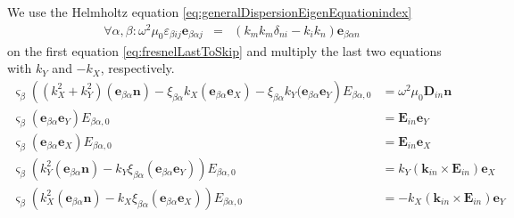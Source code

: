 \documentclass[12pt,a4paper,twoside,openright,BCOR10mm,headsepline,titlepage,abstracton,chapterprefix,final]{scrreprt}
\newcommand\Vector[1]{{\mathbf{#1}}}
\newcommand\vacuum{0}
\newcommand\wavenumber{k}
\newcommand\Wavevector{\Vector{\wavenumber}}
\newcommand\scalarEfield{E}
\newcommand\scalarDfield{D}
\newcommand\Efield{\Vector{\scalarEfield}}
\newcommand\Dfield{\Vector{\scalarDfield}}
\newcommand\vacuumpermeability{\scalarpermeability_{\vacuum}}
\newcommand\scalarpermeability{\mu}
\newcommand\scalarpermittivity{\varepsilon}
\begin{document}
We use the Helmholtz equation \eqref{eq:generalDispersionEigenEquationindex}
\begin{eqnarray}
 \forall \alpha, \beta : \omega^2 \vacuumpermeability \scalarpermittivity_{\beta ij} \Vector{e}_{\beta \alpha j} 
 &=&
 \left(
   \wavenumber_m \wavenumber_m \delta_{ni}
   -
   \wavenumber_i \wavenumber_n
 \right)
 \Vector{e}_{\beta \alpha n} 
\end{eqnarray}
on the first equation \eqref{eq:fresnelLastToSkip} and multiply the last two equations 
with $\wavenumber_Y$ and $-\wavenumber_X$, respectively.
\begin{subequations}
  \begin{align*}
    \varsigma_\beta \left( ( \wavenumber_X^2 + \wavenumber_Y^2 ) (\Vector{e}_{\beta\alpha} \Vector{n}) - \xi_{\beta\alpha} \wavenumber_X (\Vector{e}_{\beta\alpha} \Vector{e}_X) - \xi_{\beta\alpha} \wavenumber_Y (\Vector{e}_{\beta\alpha} \Vector{e}_Y  \right) E_{\beta\alpha,0} &= \omega^2 \vacuumpermeability \Dfield_{in} \Vector{n} \\
    \varsigma_\beta (\Vector{e}_{\beta\alpha} \Vector{e}_Y) E_{\beta\alpha,0} &= \Efield_{in} \Vector{e}_Y \\
    \varsigma_\beta (\Vector{e}_{\beta\alpha} \Vector{e}_X) E_{\beta\alpha,0} &= \Efield_{in} \Vector{e}_X \\
    \varsigma_\beta \left( \wavenumber_Y^2 ( \Vector{e}_{\beta\alpha} \Vector{n} )  - \wavenumber_Y \xi_{\beta\alpha} ( \Vector{e}_{\beta\alpha} \Vector{e}_Y) \right) E_{\beta\alpha,0} &=  \wavenumber_Y (\Wavevector_{in} \times \Efield_{in}) \Vector{e}_X \\
    \varsigma_\beta \left( \wavenumber_X^2 ( \Vector{e}_{\beta\alpha} \Vector{n} )  - \wavenumber_X \xi_{\beta\alpha} ( \Vector{e}_{\beta\alpha} \Vector{e}_X) \right) E_{\beta\alpha,0} &= -\wavenumber_X (\Wavevector_{in} \times \Efield_{in}) \Vector{e}_Y 
  \end{align*}
\end{subequations}
\end{document}
